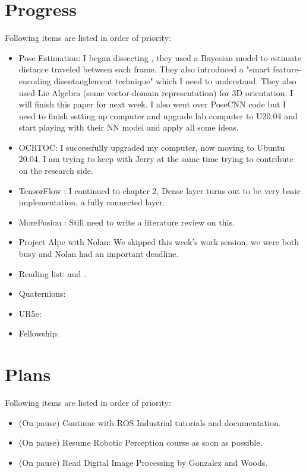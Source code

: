 \documentclass[11pt]{article}
\begin{document}
\section{Progress}
Following items are listed in order of priority:
\begin{itemize}
	\item Pose Estimation: I began dissecting \cite{tobin2017domain}, they used a Bayesian model to estimate distance traveled between each frame. They also introduced a "smart feature-encoding disentanglement technique" which I need to understand. They also used Lie Algebra (some vector-domain representation) for 3D orientation. I will finish this paper for next week. I also went over PoseCNN code but I need to finish setting up computer and upgrade lab computer to U20.04 and start playing with their NN model and apply all some ideas.

	\item OCRTOC: I successfully upgraded my computer,
	      now moving to Ubuntu 20.04. I am trying to keep with Jerry at the same time trying to contribute on the research side.

	\item TensorFlow \cite{CVTF2}: I continued to
	      chapter 2, Dense layer turns out to be very basic implementation, a fully connected layer.

	\item MoreFusion \cite{MoreFusion}: Still need to write a literature review on this.

	\item Project Alpe with Nolan: We skipped this week's work session, we were both busy and Nolan had an important deadline.
	\item Reading list: \cite{lampinen2001bayesian} and \cite{li2019survey}.
	\item Quaternions:
	\item UR5e:
	\item Fellowship:




\end{itemize}

\newpage

\section{Plans}
Following items are listed in order of priority:

\begin{itemize}

	\item (On pause) Continue with ROS Industrial tutorials and documentation.

	\item (On pause) Resume Robotic Perception course as soon as possible.

	\item (On pause) Read Digital Image Processing by Gonzalez and Woods.

\end{itemize}



\newpage


\end{document}

